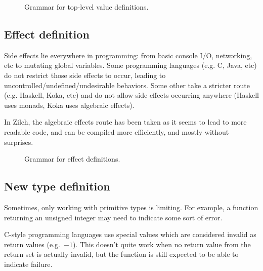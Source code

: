 \begin{figure}[H]
	\centering


	\caption{Grammar for top-level value definitions.}
	\label{fig:zilch-grammar-declarations-value-toplevel-grammar}
\end{figure}

\subsection{Effect definition}\label{subsec:zilch-grammar-declaration-effect}

Side effects lie everywhere in programming: from basic console I/O, networking, etc to mutating global variables.
Some programming languages (e.g. C, Java, etc) do not restrict those side effects to occur, leading to uncontrolled/undefined/undesirable behaviors.
Some other take a stricter route (e.g. Haskell, Koka, etc) and do not allow side effects occurring anywhere (Haskell uses monads, Koka uses algebraic effects).

In Zilch, the algebraic effects route has been taken as it seems to lead to more readable code, and can be compiled more efficiently, and mostly without surprises.

\begin{figure}[H]
	\centering


	\caption{Grammar for effect definitions.}
	\label{fig:zilch-grammar-declarations-effects-grammar}
\end{figure}

\subsection{New type definition}\label{subsec:zilch-grammar-declarations-type}

Sometimes, only working with primitive types is limiting.
For example, a function returning an unsigned integer may need to indicate some sort of error.

\noindent C-style programming languages use special values which are considered invalid as return values (e.g.\ $-1$).
This doesn't quite work when no return value from the return set is actually invalid, but the function is still expected to be able to indicate failure.


